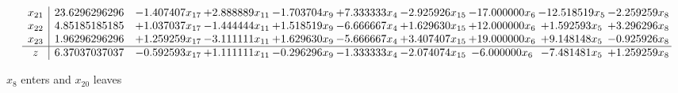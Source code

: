 \documentclass[10pt]{article}
\begin{document}
\[\begin{array}{c| c c@{\hskip 2pt} c@{\hskip 2pt} c@{\hskip 2pt} c@{\hskip 2pt} c@{\hskip 2pt} c@{\hskip 2pt} c@{\hskip 2pt} c@{\hskip 2pt} }
 x_{21}   &  23.6296296296 & -1.407407 x_{17} & + 2.888889 x_{11} & -1.703704 x_{9} & + 7.333333 x_{4} & -2.925926 x_{15} & -17.000000 x_{6} & -12.518519 x_{5} & -2.259259 x_{8}\\
 x_{22}   &  4.85185185185 & + 1.037037 x_{17} & -1.444444 x_{11} & + 1.518519 x_{9} & -6.666667 x_{4} & + 1.629630 x_{15} & + 12.000000 x_{6} & + 1.592593 x_{5} & + 3.296296 x_{8}\\
 x_{23}   &  1.96296296296 & + 1.259259 x_{17} & -3.111111 x_{11} & + 1.629630 x_{9} & -5.666667 x_{4} & + 3.407407 x_{15} & + 19.000000 x_{6} & + 9.148148 x_{5} & -0.925926 x_{8}\\
\hline
z    &  6.37037037037 & -0.592593 x_{17} & + 1.111111 x_{11} & -0.296296 x_{9} & -1.333333 x_{4} & -2.074074 x_{15} & -6.000000 x_{6} & -7.481481 x_{5} & + 1.259259 x_{8}\\
\end{array}\]


 $ x_{8} $ enters and $ x_{20} $ leaves 
\end{document}
